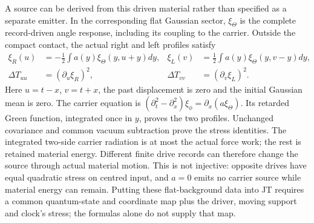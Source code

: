 A source can be derived from this driven material rather than specified
as a separate emitter. In the corresponding flat Gaussian sector,
$\xi_\Theta$ is the complete record-driven angle response, including
its coupling to the carrier. Outside the compact contact, the actual
right and left profiles satisfy
\begin{align}
 \xi_R(u)&=-\frac12\int a(y)\xi_\Theta(y,u+y)dy,
 &\xi_L(v)&=\frac12\int a(y)\xi_\Theta(y,v-y)dy,\nonumber\\
 \Delta T_{uu}&=(\partial_u\xi_R)^2,
 &\Delta T_{vv}&=(\partial_v\xi_L)^2.
 \label{eq:material-emitted-source}
\end{align}
Here $u=t-x$, $v=t+x$, the past displacement is zero and the
initial Gaussian mean is zero. The carrier equation is
$(\partial_t^2-\partial_x^2)\xi_\phi=\partial_x(a\xi_\Theta)$.
Its retarded Green function, integrated once in $y$, proves the two
profiles. Unchanged covariance and common vacuum subtraction prove the
stress identities. The integrated two-side carrier radiation is at
most the actual force work; the rest is retained material energy.
Different finite drive records can therefore change the source through
actual material motion. This is not injective: opposite drives have
equal quadratic stress on centred input, and $a=0$ emits no carrier
source while material energy can remain. Putting these flat-background
data into JT requires a common quantum-state and coordinate map plus
the driver, moving support and clock's stress; the formulas alone do
not supply that map.

